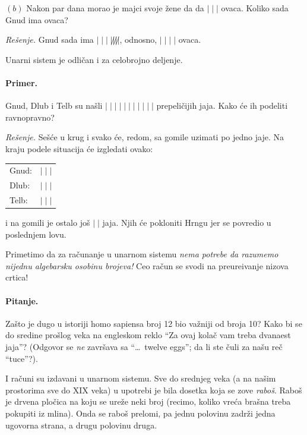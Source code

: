 \medskip

$(b)$ Nakon par dana morao je majci svoje \v zene da da $|\;|\;|$ ovaca. Koliko sada Gnud ima ovaca?

\medskip

\textit{Re\v senje.} Gnud sada ima $|\;|\;|\;|\!\not|\!\not|\!\not|$, odnosno, $|\;|\;|\;|$ ovaca.

\medskip

Unarni sistem je odli\v can i za celobrojno deljenje.

\paragraph{Primer.} Gnud, Dlub i Telb su na\v sli $|\;|\;|\;|\;|\;|\;|\;|\;|\;|\;|$ prepeli\v cijih jaja.
Kako \'ce ih podeliti ravnopravno?

\medskip

\textit{Re\v senje.} Se\v s\'ce u krug i svako \'ce, redom, sa gomile uzimati po jedno jaje. Na kraju podele situacija
\'ce izgledati ovako:
\begin{center}
    \begin{tabular}{ll}
        Gnud: & $|\;|\;|$\\
        Dlub: & $|\;|\;|$\\
        Telb: & $|\;|\;|$
    \end{tabular}
\end{center}
i na gomili je ostalo jo\v s $|\;|$ jaja. Njih \'ce pokloniti Hrngu jer se povredio u poslednjem lovu.

\medskip

Primetimo da za ra\v cunanje u unarnom sistemu \emph{nema potrebe da razumemo nijednu algebarsku osobinu brojeva!}
Ceo ra\v cun se svodi na preure\dj ivanje nizova crtica!

\paragraph{Pitanje.} Za\v sto je dugo u istoriji homo sapiensa broj 12 bio va\v zniji od broja 10?
Kako bi se do sredine pro\v slog veka na engleskom reklo \enquote{Za ovaj kola\v c vam treba dvanaest jaja}?
(Odgovor se \emph{ne} zavr\v sava sa \enquote{\ldots\ twelve eggs}; da li ste \v culi za na\v su re\v c \enquote{tuce}?).

\medskip

I ra\v cuni su izdavani u unarnom sistemu. Sve do srednjeg veka (a na na\v sim prostorima sve do XIX veka)
u upotrebi je bila dosetka koja se zove \emph{rabo\v s}. Rabo\v s je drvena plo\v cica na koju se ure\v ze neki broj
(recimo, koliko vre\'ca bra\v sna treba pokupiti iz mlina). Onda se rabo\v s prelomi, pa jednu polovinu zadr\v zi jedna
ugovorna strana, a drugu polovinu druga.

